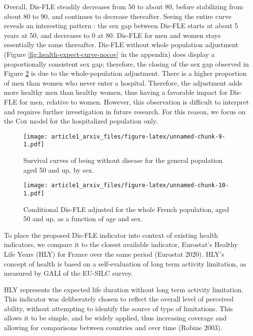\documentclass{article}
\begin{document}
Overall, Dis-FLE steadily decreases from 50 to about 80, before
stabilizing from about 80 to 90, and continues to decrease thereafter.
Seeing the entire curve reveals an interesting pattern : the sex gap
between Dis-FLE starts at about 5 years at 50, and decreases to 0 at 80.
Dis-FLE for men and women stays essentially the same thereafter. Dis-FLE
without whole population adjustment (Figure
\ref{fig:health-expect-curve-nocov} in the appendix) does display a
proportionally consistent sex gap; therefore, the closing of the sex gap
observed in Figure \ref{fig:health-adj-expect-curve-nocov} is due to the
whole-population adjustment. There is a higher proportion of men than
women who never enter a hospital. Therefore, the adjustment adds more
healthy men than healthy women, thus having a favorable impact for
Dis-FLE for men, relative to women. However, this observation is
difficult to interpret and requires further investigation in future
research. For this reason, we focus on the Cox model for the
hospitalized population only.

\begin{figure}
\centering
\texttt{[image: article1\_arxiv\_files/figure-latex/unnamed-chunk-9-1.pdf]}
\caption{\label{fig:health-adj-surv-curve-nocov}Survival curves of being
without disease for the general population aged 50 and up, by sex.}
\end{figure}

\begin{figure}
\centering
\texttt{[image: article1\_arxiv\_files/figure-latex/unnamed-chunk-10-1.pdf]}
\caption{\label{fig:health-adj-expect-curve-nocov} Conditional Dis-FLE
adjusted for the whole French population, aged 50 and up, as a function
of age and sex.}
\end{figure}

To place the proposed Dis-FLE indicator into context of existing health
indicators, we compare it to the closest available indicator, Eurostat's
Healthy Life Years (HLY) for France over the same period (Eurostat
2020). HLY's concept of health is based on a self-evaluation of long
term activity limitation, as measured by GALI of the EU-SILC survey.

HLY represents the expected life duration without long term activity
limitation. This indicator was deliberately chosen to reflect the
overall level of perceived ability, without attempting to identify the
source of type of limitations. This allows it to be simple, and be
widely applied, thus increasing coverage and allowing for comparisons
between countries and over time (Robine 2003).
\end{document}
